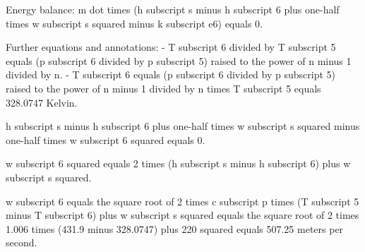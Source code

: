 Energy balance:  
m dot times (h subscript s minus h subscript 6 plus one-half times w subscript s squared minus k subscript e6) equals 0.  

Further equations and annotations:  
- T subscript 6 divided by T subscript 5 equals (p subscript 6 divided by p subscript 5) raised to the power of n minus 1 divided by n.  
- T subscript 6 equals (p subscript 6 divided by p subscript 5) raised to the power of n minus 1 divided by n times T subscript 5 equals 328.0747 Kelvin.  

h subscript s minus h subscript 6 plus one-half times w subscript s squared minus one-half times w subscript 6 squared equals 0.  

w subscript 6 squared equals 2 times (h subscript s minus h subscript 6) plus w subscript s squared.  

w subscript 6 equals the square root of 2 times c subscript p times (T subscript 5 minus T subscript 6) plus w subscript s squared equals the square root of 2 times 1.006 times (431.9 minus 328.0747) plus 220 squared equals 507.25 meters per second.